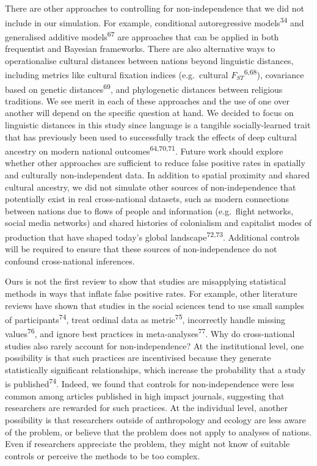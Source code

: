 \documentclass[
  man,floatsintext]{apa6}
\begin{document}
There are other approaches to controlling for non-independence that we did not include in our simulation. For example, conditional autoregressive models\textsuperscript{34} and generalised additive models\textsuperscript{67} are approaches that can be applied in both frequentist and Bayesian frameworks. There are also alternative ways to operationalise cultural distances between nations beyond linguistic distances, including metrics like cultural fixation indices (e.g.~cultural \(F_{ST}\)\textsuperscript{6,68}), covariance based on genetic distances\textsuperscript{69}, and phylogenetic distances between religious traditions. We see merit in each of these approaches and the use of one over another will depend on the specific question at hand. We decided to focus on linguistic distances in this study since language is a tangible socially-learned trait that has previously been used to successfully track the effects of deep cultural ancestry on modern national outcomes\textsuperscript{64,70,71}. Future work should explore whether other approaches are sufficient to reduce false positive rates in spatially and culturally non-independent data. In addition to spatial proximity and shared cultural ancestry, we did not simulate other sources of non-independence that potentially exist in real cross-national datasets, such as modern connections between nations due to flows of people and information (e.g.~flight networks, social media networks) and shared histories of colonialism and capitalist modes of production that have shaped today's global landscape\textsuperscript{72,73}. Additional controls will be required to ensure that these sources of non-independence do not confound cross-national inferences.

Ours is not the first review to show that studies are misapplying statistical methods in ways that inflate false positive rates. For example, other literature reviews have shown that studies in the social sciences tend to use small samples of participants\textsuperscript{74}, treat ordinal data as metric\textsuperscript{75}, incorrectly handle missing values\textsuperscript{76}, and ignore best practices in meta-analyses\textsuperscript{77}. Why do cross-national studies also rarely account for non-independence? At the institutional level, one possibility is that such practices are incentivised because they generate statistically significant relationships, which increase the probability that a study is published\textsuperscript{74}. Indeed, we found that controls for non-independence were less common among articles published in high impact journals, suggesting that researchers are rewarded for such practices. At the individual level, another possibility is that researchers outside of anthropology and ecology are less aware of the problem, or believe that the problem does not apply to analyses of nations. Even if researchers appreciate the problem, they might not know of suitable controls or perceive the methods to be too complex.
\end{document}
